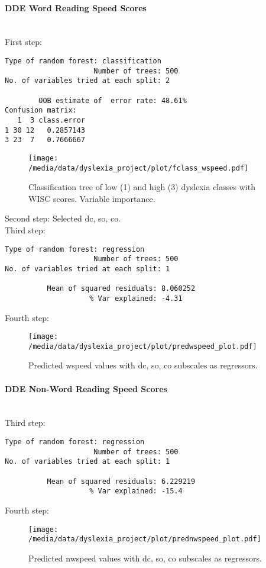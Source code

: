 \documentclass[11pt, a4paper, twoside, openright]{article}
\begin{document}
\paragraph{DDE Word Reading Speed Scores}
\mbox{}\\
First step:
\begin{verbatim}
Type of random forest: classification
                     Number of trees: 500
No. of variables tried at each split: 2

        OOB estimate of  error rate: 48.61%
Confusion matrix:
   1  3 class.error
1 30 12   0.2857143
3 23  7   0.7666667
\end{verbatim}
\begin{figure}[h!] 
\centering
\texttt{[image: /media/data/dyslexia\_project/plot/fclass\_wspeed.pdf]}
\caption{Classification tree of low (1) and high (3) dyslexia classes with WISC scores. Variable importance.}
\label{fig:15}
\end{figure}

\clearpage

Second step: Selected dc, so, co.\\
Third step:
\begin{verbatim}
Type of random forest: regression
                     Number of trees: 500  
No. of variables tried at each split: 1

          Mean of squared residuals: 8.060252
                    % Var explained: -4.31
\end{verbatim}
Fourth step:
\begin{figure}[h!] 
\centering
\texttt{[image: /media/data/dyslexia\_project/plot/predwspeed\_plot.pdf]}
\caption{Predicted wspeed values with dc, so, co subscales as regressors.}
\label{fig:16}
\end{figure}

\paragraph{DDE Non-Word Reading Speed Scores}
\mbox{}\\
Third step:
\begin{verbatim}
Type of random forest: regression
                     Number of trees: 500
No. of variables tried at each split: 1

          Mean of squared residuals: 6.229219
                    % Var explained: -15.4
\end{verbatim}  
Fourth step:
\begin{figure}[h!] 
\centering
\texttt{[image: /media/data/dyslexia\_project/plot/prednwspeed\_plot.pdf]}
\caption{Predicted nwspeed values with dc, so, co subscales as regressors.}
\label{fig:17}
\end{figure}
\end{document}
